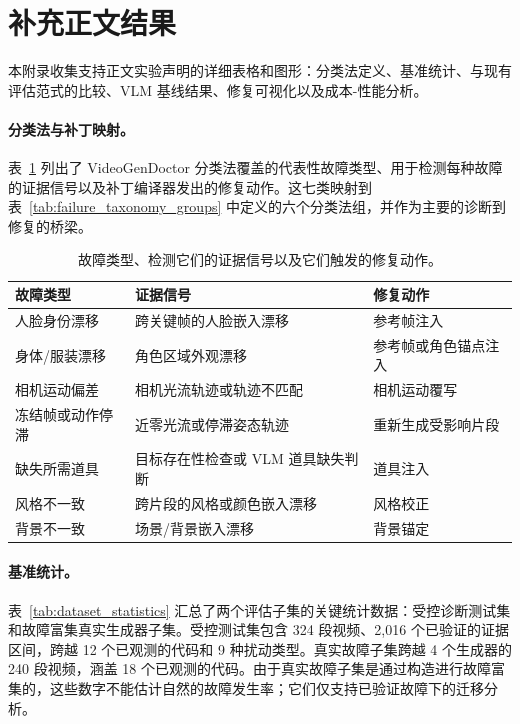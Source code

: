 \documentclass{article}
\begin{document}
\appendix


\section{补充正文结果}
\label{app:moved_main_details}
本附录收集支持正文实验声明的详细表格和图形：分类法定义、基准统计、与现有评估范式的比较、VLM 基线结果、修复可视化以及成本-性能分析。

\paragraph{分类法与补丁映射。}
表~\ref{tab:code_patch_mapping} 列出了 VideoGenDoctor 分类法覆盖的代表性故障类型、用于检测每种故障的证据信号以及补丁编译器发出的修复动作。这七类映射到表~\ref{tab:failure_taxonomy_groups} 中定义的六个分类法组，并作为主要的诊断到修复的桥梁。

\begin{table}[t]
\centering
\footnotesize
\caption{故障类型、检测它们的证据信号以及它们触发的修复动作。}
\label{tab:code_patch_mapping}
\begin{tabular}{p{}p{}p{}}
\toprule
\textbf{故障类型} & \textbf{证据信号} & \textbf{修复动作} \\
\midrule
人脸身份漂移 & 跨关键帧的人脸嵌入漂移 & 参考帧注入 \\
身体/服装漂移 & 角色区域外观漂移 & 参考帧或角色锚点注入 \\
相机运动偏差 & 相机光流轨迹或轨迹不匹配 & 相机运动覆写 \\
冻结帧或动作停滞 & 近零光流或停滞姿态轨迹 & 重新生成受影响片段 \\
缺失所需道具 & 目标存在性检查或 VLM 道具缺失判断 & 道具注入 \\
风格不一致 & 跨片段的风格或颜色嵌入漂移 & 风格校正 \\
背景不一致 & 场景/背景嵌入漂移 & 背景锚定 \\
\bottomrule
\end{tabular}
\end{table}

\paragraph{基准统计。}
表~\ref{tab:dataset_statistics} 汇总了两个评估子集的关键统计数据：受控诊断测试集和故障富集真实生成器子集。受控测试集包含 324 段视频、2,016 个已验证的证据区间，跨越 12 个已观测的代码和 9 种扰动类型。真实故障子集跨越 4 个生成器的 240 段视频，涵盖 18 个已观测的代码。由于真实故障子集是通过构造进行故障富集的，这些数字不能估计自然的故障发生率；它们仅支持已验证故障下的迁移分析。
\end{document}
